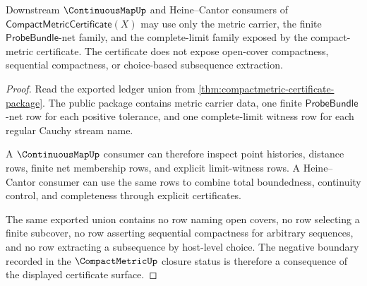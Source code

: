 \begin{theorem}
\label{thm:compactmetric-downstream-consumer-boundary}
Downstream $\ContinuousMapUp$ and Heine--Cantor consumers of
$\mathsf{CompactMetricCertificate}(X)$ may use only the metric carrier, the
finite $\mathsf{ProbeBundle}$-net family, and the complete-limit family
exposed by the compact-metric certificate. The certificate does not expose
open-cover compactness, sequential compactness, or choice-based subsequence
extraction.
\end{theorem}
\begin{proof}
Read the exported ledger union from
\autoref{thm:compactmetric-certificate-package}. The public package contains
metric carrier data, one finite $\mathsf{ProbeBundle}$-net row for each
positive tolerance, and one complete-limit witness row for each regular
Cauchy stream name.

A $\ContinuousMapUp$ consumer can therefore inspect point histories, distance
rows, finite net membership rows, and explicit limit-witness rows. A
Heine--Cantor consumer can use the same rows to combine total boundedness,
continuity control, and completeness through explicit certificates.

The same exported union contains no row naming open covers, no row selecting a
finite subcover, no row asserting sequential compactness for arbitrary
sequences, and no row extracting a subsequence by host-level choice. The
negative boundary recorded in the $\CompactMetricUp$ closure status is
therefore a consequence of the displayed certificate surface.
\end{proof}

